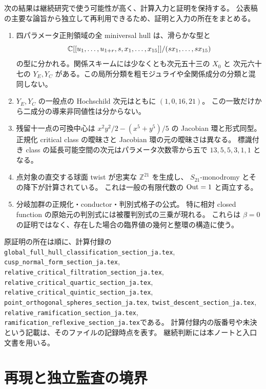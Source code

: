 次の結果は継続研究で使う可能性が高く、計算入力と証明を保持する。
公表稿の主要な論旨から独立して再利用できるため、証明と入力の所在をまとめる。
\begin{enumerate}
\item 四パラメータ正則領域の全 miniversal hull は、滑らかな型と
\[
 \mathbb C[[u_1,\ldots,u_{1+r},s,x_1,\ldots,x_{15}]]/(sx_1,\ldots,sx_{15})
\]
の型に分かれる。関係スキームには少なくとも次元五十三の $X_0$ と
次元六十七の $Y_E,Y_C$ がある。この局所分類を粗モジュライや全関係成分の分類と混同しない。
\item $Y_E,Y_C$ の一般点の Hochschild 次元はともに $(1,0,16,21)$。
この一致だけから二成分の導来非同値性は分からない。
\item 残留十一点の可換中心は
$x^2y^2/2-(x^5+y^5)/5$ の Jacobian 環と形式同型。
正規化 critical class の曖昧さと Jacobian 環の元の曖昧さは異なる。
標識付き class の延長可能空間の次元はパラメータ次数零から五で
$13,5,5,3,1,1$ となる。
\item 点対象の直交する球面 twist が忠実な $\mathbb Z^{21}$ を生成し、
$S_{21}$-monodromy とその降下が計算されている。
これは一般の有限代数の $\operatorname{Out}=1$ と両立する。
\item 分岐加群の正規化・conductor・判別式格子の公式。
特に相対 closed function の原始元の判別式には被覆判別式の三乗が現れる。
これらは $\beta=0$ の証明ではなく、存在した場合の臨界値の幾何と整環の構造に使う。
\end{enumerate}

原証明の所在は順に、計算付録の
\nolinkurl{global_full_hull_classification_section_ja.tex},
\nolinkurl{cusp_normal_form_section_ja.tex},
\nolinkurl{relative_critical_filtration_section_ja.tex},
\nolinkurl{relative_critical_quartic_section_ja.tex},
\nolinkurl{relative_critical_quintic_section_ja.tex},
\nolinkurl{point_orthogonal_spheres_section_ja.tex},
\nolinkurl{twist_descent_section_ja.tex},
\nolinkurl{relative_ramification_section_ja.tex},
\nolinkurl{ramification_reflexive_section_ja.tex}である。
計算付録内の版番号や未決という記載は、そのファイルの記録時点を表す。
継続判断には本ノートと入口文書を用いる。

\section{再現と独立監査の境界}

